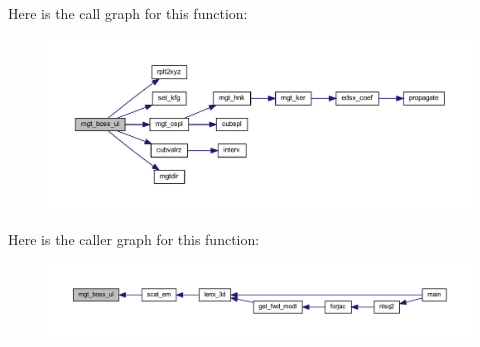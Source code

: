 Here is the call graph for this function\+:\nopagebreak
\begin{figure}[H]
\begin{center}
\leavevmode
\includegraphics[width=350pt]{Leroi_8f90_adec9f2398e7872ff5617d3c0adffba35_cgraph}
\end{center}
\end{figure}
Here is the caller graph for this function\+:\nopagebreak
\begin{figure}[H]
\begin{center}
\leavevmode
\includegraphics[width=350pt]{Leroi_8f90_adec9f2398e7872ff5617d3c0adffba35_icgraph}
\end{center}
\end{figure}
\mbox{\label{Leroi_8f90_afd2db4ed971ee6e92ca6da7bece2caff}} 
